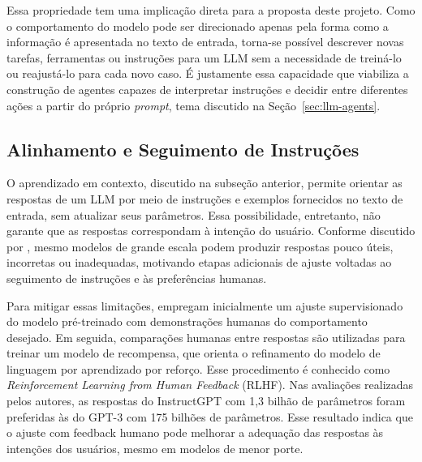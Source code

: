 Essa propriedade tem uma implicação direta para a proposta deste projeto. Como o comportamento do modelo pode ser direcionado apenas pela forma como a informação é apresentada no texto de entrada, torna-se possível descrever novas tarefas, ferramentas ou instruções para um LLM sem a necessidade de treiná-lo ou reajustá-lo para cada novo caso. É justamente essa capacidade que viabiliza a construção de agentes capazes de interpretar instruções e decidir entre diferentes ações a partir do próprio \textit{prompt}, tema discutido na Seção~\ref{sec:llm-agents}.

  
\subsection{Alinhamento e Seguimento de Instruções}
\label{subsec:alinhamento}

O aprendizado em contexto, discutido na subseção anterior, permite orientar as respostas de um LLM por meio de instruções e exemplos fornecidos no texto de entrada, sem atualizar seus parâmetros. Essa possibilidade, entretanto, não garante que as respostas correspondam à intenção do usuário. Conforme discutido por \citet{ouyang2022instructgpt}, mesmo modelos de grande escala podem produzir respostas pouco úteis, incorretas ou inadequadas, motivando etapas adicionais de ajuste voltadas ao seguimento de instruções e às preferências humanas.

Para mitigar essas limitações, \citet{ouyang2022instructgpt} empregam inicialmente um ajuste supervisionado do modelo pré-treinado com demonstrações humanas do comportamento desejado. Em seguida, comparações humanas entre respostas são utilizadas para treinar um modelo de recompensa, que orienta o refinamento do modelo de linguagem por aprendizado por reforço. Esse procedimento é conhecido como \textit{Reinforcement Learning from Human Feedback} (RLHF). Nas avaliações realizadas pelos autores, as respostas do InstructGPT com 1,3 bilhão de parâmetros foram preferidas às do GPT-3 com 175 bilhões de parâmetros. Esse resultado indica que o ajuste com feedback humano pode melhorar a adequação das respostas às intenções dos usuários, mesmo em modelos de menor porte.

